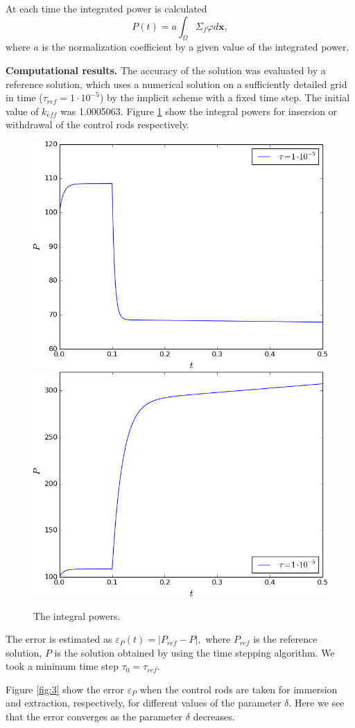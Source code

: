 \documentclass[runningheads]{llncs}
\begin{document}
At each time the integrated power is calculated 
\[
P(t) = a\int_{\Omega}\Sigma_f \varphi d\bm x,
\]
where $a$ is the normalization coefficient by a given value of the integrated power.

\textbf{Computational results.}
The accuracy of the solution was evaluated by a reference solution, which uses a numerical solution on a sufficiently detailed grid in time
($\tau_{ref} = 1 \cdot 10^{-5}$) by the implicit scheme with a fixed time step. The initial value of $k_{eff}$ was 1.0005063. Figure \ref{fig:2} show the integral powers for  insersion or withdrawal of the control rods respectively.

\begin{figure}[ht]
  \begin{center}
    \includegraphics[width=0.48\linewidth] {power_down.png}
    \includegraphics[width=0.48\linewidth] {power_up.png}
	\caption{The integral powers.}
	\label{fig:2}
  \end{center}
\end{figure}

The error is estimated as $\varepsilon_P(t) = |P_{ref} - P|,$
where $P_{ref}$ is the reference solution, $P$ is the solution obtained by using the time stepping algorithm.
We took a minimum time step $\tau_0 = \tau_{ref}$.

Figure \ref{fig:3} show the error $\varepsilon_P$ when the control rods are taken for immersion and extraction, respectively, for different values of the parameter
$\delta$. Here we see that the error converges as the parameter $\delta$ decreases.
\end{document}
